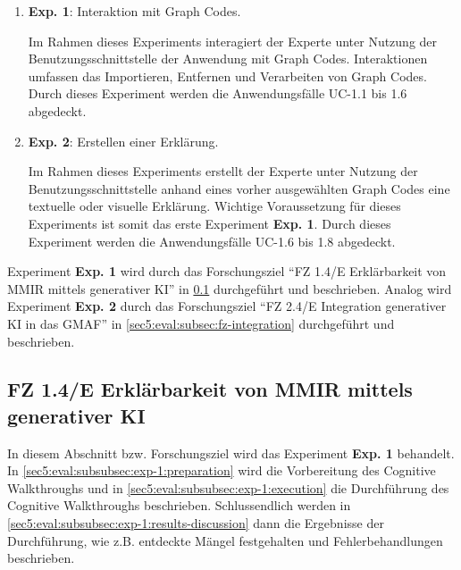 \begin{enumerate}
  \item \textbf{Exp. 1}: Interaktion mit Graph Codes.

  Im Rahmen dieses Experiments interagiert der Experte unter Nutzung der Benutzungsschnittstelle der Anwendung mit Graph Codes.
  Interaktionen umfassen das Importieren, Entfernen und Verarbeiten von Graph Codes.
  Durch dieses Experiment werden die Anwendungsfälle UC-1.1 bis 1.6 abgedeckt.

  \item \textbf{Exp. 2}: Erstellen einer Erklärung.

  Im Rahmen dieses Experiments erstellt der Experte unter Nutzung der Benutzungsschnittstelle anhand eines vorher ausgewählten Graph Codes eine textuelle oder visuelle Erklärung.
  Wichtige Voraussetzung für dieses Experiments ist somit das erste Experiment \textbf{Exp. 1}.
  Durch dieses Experiment werden die Anwendungsfälle UC-1.6 bis 1.8 abgedeckt.
\end{enumerate}

Experiment \textbf{Exp. 1} wird durch das Forschungsziel \enquote{FZ 1.4/E Erklärbarkeit von MMIR mittels generativer KI} in \cref{sec5:eval:subsec:fz-explainability} durchgeführt und beschrieben.
Analog wird Experiment \textbf{Exp. 2} durch das Forschungsziel \enquote{FZ 2.4/E Integration generativer KI in das GMAF} in \cref{sec5:eval:subsec:fz-integration} durchgeführt und beschrieben.

\clearpage

\subsection[FZ 1.4/E Erklärbarkeit von MMIR mittels generativer KI]{\texorpdfstring{FZ 1.4/E Erklärbarkeit von MMIR mittels \\ generativer KI}{FZ 1.4/E Erklärbarkeit von MMIR mittels generativer KI}}
\label{sec5:eval:subsec:fz-explainability}
In diesem Abschnitt bzw. Forschungsziel wird das Experiment \textbf{Exp. 1} behandelt.
In \cref{sec5:eval:subsubsec:exp-1:preparation} wird die Vorbereitung des Cognitive Walkthroughs und in \cref{sec5:eval:subsubsec:exp-1:execution} die Durchführung des Cognitive Walkthroughs beschrieben.
Schlussendlich werden in \cref{sec5:eval:subsubsec:exp-1:results-discussion} dann die Ergebnisse der Durchführung, wie z.B. entdeckte Mängel festgehalten und Fehlerbehandlungen beschrieben.

